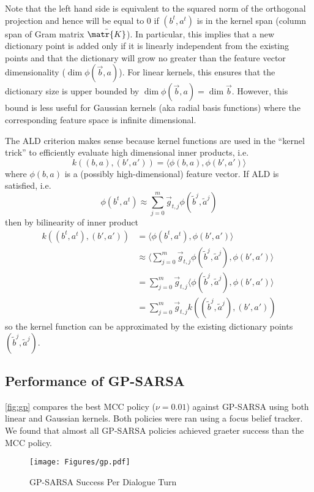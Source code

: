 \documentclass[a4paper,oneside,reqno]{amsart}
\begin{document}
Note that the left hand side is equivalent to the squared norm of the
orthogonal projection and hence will be equal to $0$ if $(b^t, a^t)$ is in the
kernel span (column span of Gram matrix $\tilde{\matr{K}}$). In particular, this implies
that a new dictionary point is added only if it is linearly independent from
the existing points and that the dictionary will grow no greater than the
feature vector dimensionality ($\dim \phi(\vec{b},a)$). For linear kernels,
this ensures that the dictionary size is upper bounded by $\dim \phi(\vec{b},a)
= \dim \vec{b}$. However, this bound is less useful for Gaussian kernels (aka radial
basis functions) where the corresponding feature space is infinite dimensional.

The ALD criterion makes sense because kernel functions are used in the ``kernel trick''
to efficiently evaluate high dimensional inner products, i.e.
\[
  k((b,a),(b',a')) = \langle \phi(b,a), \phi(b',a') \rangle
\]
where $\phi(b,a)$ is a (possibly high-dimensional) feature vector. If ALD
is satisfied, i.e.
\[
  \phi(b^t, a^t) \approx \sum_{j=0}^m \vec{g}_{t,j} \phi(\tilde{b}^j, \tilde{a}^j)
\]
then by bilinearity of inner product
\begin{align}
  k((b^t, a^t), (b', a'))
  &= \langle \phi(b^t, a^t), \phi(b', a') \rangle\\
  &\approx \langle \sum_{j=0}^m \vec{g}_{t,j} \phi(\tilde{b}^j, \tilde{a}^j), \phi(b', a') \rangle\\
  &= \sum_{j=0}^m \vec{g}_{t,j} \langle \phi(\tilde{b}^j, \tilde{a}^j), \phi(b', a') \rangle\\
  &= \sum_{j=0}^m \vec{g}_{t,j} k((\tilde{b}^j, \tilde{a}^j), (b', a'))
\end{align}
so the kernel function can be approximated by the existing dictionary points
$(\tilde{b}^j, \tilde{a}^j)$.


\subsection{Performance of GP-SARSA}

\autoref{fig:gp} compares the best MCC policy ($\nu=0.01$) against GP-SARSA
using both linear and Gaussian kernels. Both policies were ran using a focus
belief tracker. We found that almost all GP-SARSA policies achieved graeter
success than the MCC policy.

\begin{figure}[ht!]
  \begin{center}
    \texttt{[image: Figures/gp.pdf]}
  \end{center}
  \caption{GP-SARSA Success Per Dialogue Turn}
  \label{fig:gp}
\end{figure}
\end{document}
